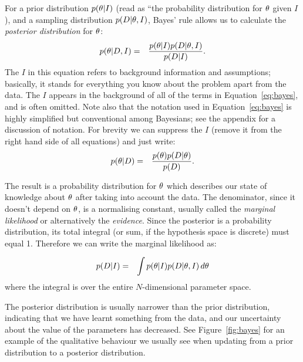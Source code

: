 For a prior distribution $p(\theta | I)$ (read as ``the probability distribution
for $\theta$ given $I$), and a sampling
distribution $p(D | \theta, I)$, Bayes' rule allows us to calculate
the {\it posterior distribution} for $\theta$:
\begin{eqnarray}
p(\theta | D, I) &=& \frac{p(\theta | I)p(D | \theta, I)}{p(D | I)}.\label{eq:bayes}
\end{eqnarray}
The $I$ in this equation refers to background information and assumptions;
basically, it stands for everything you know about the problem apart from the
data. The $I$ appears in the background of all of the terms in
Equation~\ref{eq:bayes}, and is often omitted. Note also that the notation
used in Equation~\ref{eq:bayes} is highly simplified but conventional among
Bayesians; see the appendix for a discussion of notation. For brevity we can
suppress the $I$ (remove it from the right hand side of all equations) and
just write:
\begin{eqnarray}
p(\theta | D) &=& \frac{p(\theta)p(D | \theta)}{p(D)}.\label{eq:bayes2}
\end{eqnarray}


The result is a probability distribution for $\theta$ which describes
our state of knowledge about $\theta$ after taking into account the data.
The denominator, since it doesn't depend on $\theta$, is a normalising
constant, usually called the {\it marginal likelihood} or alternatively the
{\it evidence}. Since the posterior is a probability distribution, its
total integral (or sum, if the
hypothesis space is discrete) must equal 1. Therefore we can write the
marginal likelihood as:

\begin{eqnarray}
p(D | I) &=& \int p(\theta | I)p(D | \theta, I) \, d\theta
\end{eqnarray}
where the integral is over the entire $N$-dimensional parameter space.

The posterior distribution is usually narrower than the prior distribution,
indicating that we have learnt something from the data, and our uncertainty
about the value of the parameters has decreased. See
Figure~\ref{fig:bayes} for an example of the qualitative behaviour we usually
see when updating from a prior distribution to a posterior distribution.

